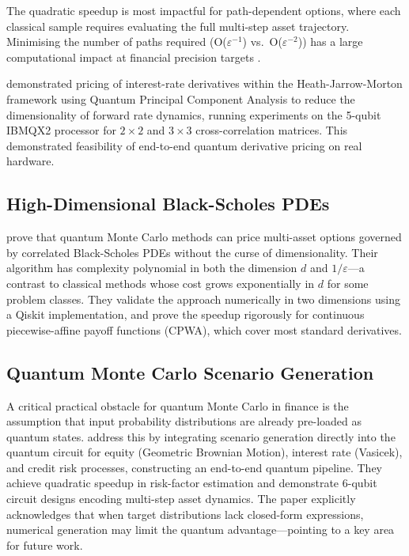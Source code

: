 \documentclass[12pt,a4paper]{article}
\begin{document}
The quadratic speedup is most impactful for path-dependent options, where each classical sample requires evaluating the full multi-step asset trajectory. Minimising the number of paths required (O($\varepsilon^{-1}$) vs.\ O($\varepsilon^{-2}$)) has a large computational impact at financial precision targets \citep{stamatopoulos_option_2020}.

\citet{martin_toward_2021} demonstrated pricing of interest-rate derivatives within the Heath-Jarrow-Morton framework using Quantum Principal Component Analysis to reduce the dimensionality of forward rate dynamics, running experiments on the 5-qubit IBMQX2 processor for $2\times 2$ and $3\times 3$ cross-correlation matrices. This demonstrated feasibility of end-to-end quantum derivative pricing on real hardware.

\subsection{High-Dimensional Black-Scholes PDEs}

\citet{chen_quantum_2025} prove that quantum Monte Carlo methods can price multi-asset options governed by correlated Black-Scholes PDEs without the curse of dimensionality. Their algorithm has complexity polynomial in both the dimension $d$ and $1/\varepsilon$---a contrast to classical methods whose cost grows exponentially in $d$ for some problem classes. They validate the approach numerically in two dimensions using a Qiskit implementation, and prove the speedup rigorously for continuous piecewise-affine payoff functions (CPWA), which cover most standard derivatives.

\subsection{Quantum Monte Carlo Scenario Generation}

A critical practical obstacle for quantum Monte Carlo in finance is the assumption that input probability distributions are already pre-loaded as quantum states. \citet{matsakos_quantum_2024} address this by integrating scenario generation directly into the quantum circuit for equity (Geometric Brownian Motion), interest rate (Vasicek), and credit risk processes, constructing an end-to-end quantum pipeline. They achieve quadratic speedup in risk-factor estimation and demonstrate 6-qubit circuit designs encoding multi-step asset dynamics. The paper explicitly acknowledges that when target distributions lack closed-form expressions, numerical generation may limit the quantum advantage---pointing to a key area for future work.
\end{document}
